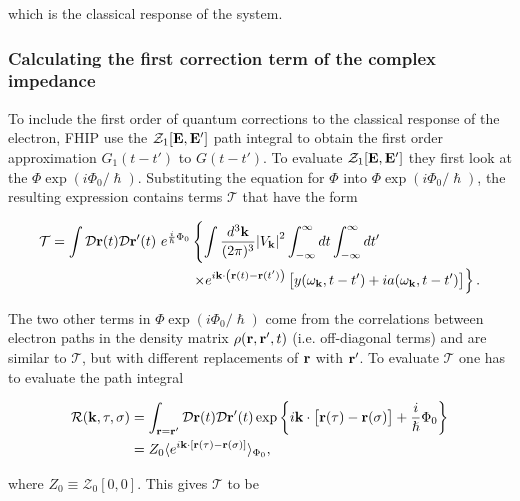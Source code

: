 which is the classical response of the system. 

\subsubsection{Calculating the first correction term of the complex impedance}

To include the first order of quantum corrections to the classical response of the electron, FHIP use the $\mathcal{Z}_1[\vb{E}, \vb{E'}]$ path integral to obtain the first order approximation $G_1(t-t')$ to $G(t-t')$. To evaluate $\mathcal{Z}_1[\vb{E}, \vb{E'}]$ they first look at the $\Phi \exp(i \Phi_0 / \hslash)$. Substituting the equation for $\Phi$ into $\Phi \exp(i \Phi_0 / \hslash)$, the resulting expression contains terms $\mathcal{T}$ that have the form

\begin{equation}
    \begin{aligned}
        \mathcal{T} = \int \mathcal{D}\vb{r}(t) \mathcal{D}\vb{r'}(t)\ e^{\frac{i}{\hslash} \Phi_0} &\left\{ \int \frac{d^3\vb{k}}{(2\pi)^3} \abs{V_{\vb{k}}}^2 \int^\infty_{-\infty} dt \int^\infty_{-\infty} dt' \right. \\ &\left. \times e^{i\vb{k}\cdot\left(\vb{r}(t) - \vb{r}(t')\right)} \left[ y(\omega_{\vb{k}}, t-t') + ia(\omega_{\vb{k}}, t-t') \right] \right\}.
    \end{aligned}
\end{equation}

The two other terms in $\Phi \exp(i \Phi_0 / \hslash)$ come from the correlations between electron paths in the density matrix $\rho(\vb{r}, \vb{r}', t)$ (i.e. off-diagonal terms) and are similar to $\mathcal{T}$, but with different replacements of $\vb{r}$ with $\vb{r'}$. To evaluate $\mathcal{T}$ one has to evaluate the path integral

\begin{equation}
    \begin{aligned}
    \mathcal{R}(\vb{k}, \tau, \sigma) &= \int_{\vb{r} = \vb{r'}} \mathcal{D}\vb{r}(t) \mathcal{D}\vb{r'}(t) \exp\left\{ i \vb{k} \cdot \left[ \vb{r}(\tau) - \vb{r}(\sigma) \right] + \frac{i}{\hslash} \Phi_0 \right\} \\
    &= Z_0 \langle e^{i \vb{k} \cdot [\vb{r}(\tau) - \vb{r}(\sigma)]}  \rangle_{\Phi_0},
    \end{aligned}
\end{equation}

where $Z_0 \equiv \mathcal{Z}_0[0, 0]$. This gives $\mathcal{T}$ to be

